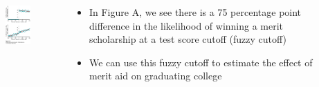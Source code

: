 \documentclass{beamer}
\begin{document}
\begin{frame}
\begin{columns}
	\begin{column}{0.48\textwidth}
  		  \begin{figure}[h]
   			 \includegraphics[width = 2.15in]{turner1e_fig_03_04.png}
   		 \end{figure}
	\end{column}
	\begin{column}{0.48\textwidth}
		\begin{itemize}[<+->]
			\item In Figure A, we see there is a 75 percentage point difference in the likelihood of winning a merit scholarship at a test score cutoff (fuzzy cutoff) \bigskip
			\item We can use this fuzzy cutoff to estimate the effect of merit aid on graduating college
		\end{itemize}
		
	\end{column}
\end{columns}

\end{frame}
\end{document}
